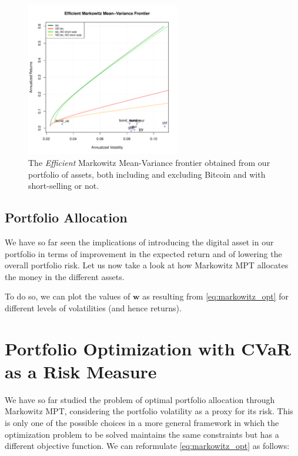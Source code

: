 \begin{figure}
	\centering
	\includegraphics[width=0.6\textwidth]{Images/efficient_frontier.pdf}
	\caption{The \textit{Efficient} Markowitz Mean-Variance frontier obtained from our portfolio of assets, both including and excluding Bitcoin and with short-selling or not.}
	\label{fig:efficient_frontier_comparison}
\end{figure}


\subsection{Portfolio Allocation}
We have so far seen the implications of introducing the digital asset in our portfolio in terms of improvement in the expected return and of lowering the overall portfolio risk.
Let us now take a look at how Markowitz MPT allocates the money in the different assets.

To do so, we can plot the values of $\mathbf{w}$ as resulting from \eqref{eq:markowitz_opt} for different levels of volatilities (and hence returns).



\section{Portfolio Optimization with CVaR as a Risk Measure}
We have so far studied the problem of optimal portfolio allocation through Markowitz MPT, considering the portfolio volatility as a proxy for its risk.
This is only one of the possible choices in a more general framework in which the optimization problem to be solved maintains the same constraints but has a  different objective function. We can reformulate \eqref{eq:markowitz_opt} as follows:

